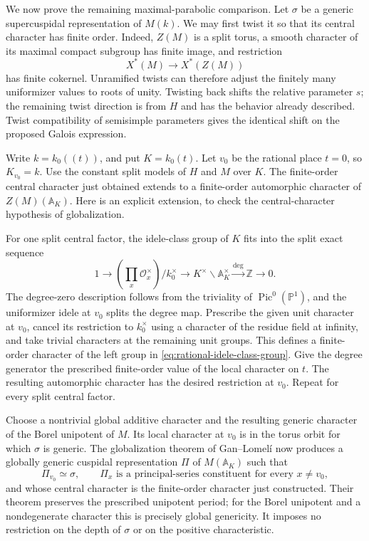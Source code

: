 We now prove the remaining maximal-parabolic comparison.  Let
$\sigma$ be a generic supercuspidal representation of $M(k)$.  We
may first twist it so that its central character has finite order.
Indeed, $Z(M)$ is a split torus, a smooth character of its maximal
compact subgroup has finite image, and restriction
\[
 X^*(M)\longrightarrow X^*(Z(M))
\]
has finite cokernel.  Unramified twists can therefore adjust the
finitely many uniformizer values to roots of unity.  Twisting back
shifts the relative parameter $s$; the remaining twist direction is
from $H$ and has the behavior already described.  Twist compatibility
of semisimple parameters gives the identical shift on the proposed
Galois expression.

Write $k=k_0((t))$, and put $K=k_0(t)$.  Let $v_0$ be the rational
place $t=0$, so $K_{v_0}=k$.  Use the constant split models of $H$ and
$M$ over $K$.  The finite-order central character just obtained
extends to a finite-order automorphic character of $Z(M)(\mathbb A_K)$.
Here is an explicit extension, to check the central-character
hypothesis of globalization.

For one split central factor, the idele-class group of $K$ fits into
the split exact sequence
\begin{equation}
 1\longrightarrow
    \left(\prod_x\mathcal O_x^\times\right)/k_0^\times
   \longrightarrow K^\times\backslash\mathbb A_K^\times
   \xrightarrow{\deg}\mathbb Z\longrightarrow0.
 \label{eq:rational-idele-class-group}
\end{equation}
The degree-zero description follows from the triviality of
$\operatorname{Pic}^0(\mathbb P^1)$, and the uniformizer idele at
$v_0$ splits the degree map.  Prescribe the given unit character at
$v_0$, cancel its restriction to $k_0^\times$ using a character of
the residue field at infinity, and take trivial characters at the
remaining unit groups.  This defines a finite-order character of
the left group in \eqref{eq:rational-idele-class-group}.  Give the
degree generator the prescribed finite-order value of the local
character on $t$.  The resulting automorphic character has the
desired restriction at $v_0$.  Repeat for every split central factor.

Choose a nontrivial global additive character and the resulting
generic character of the Borel unipotent of $M$.  Its local character
at $v_0$ is in the torus orbit for which $\sigma$ is generic.  The
globalization theorem of Gan--Lomel\'i
\cite[Theorem~1.1]{GanLomeli} now produces a globally generic
cuspidal representation $\Pi$ of $M(\mathbb A_K)$ such that
\[
 \Pi_{v_0}\simeq\sigma,
 \qquad
 \Pi_x\text{ is a principal-series constituent for every }x\ne v_0,
\]
and whose central character is the finite-order character just
constructed.  Their theorem preserves the prescribed unipotent
period; for the Borel unipotent and a nondegenerate character this
is precisely global genericity.  It imposes no restriction on the
depth of $\sigma$ or on the positive characteristic.

